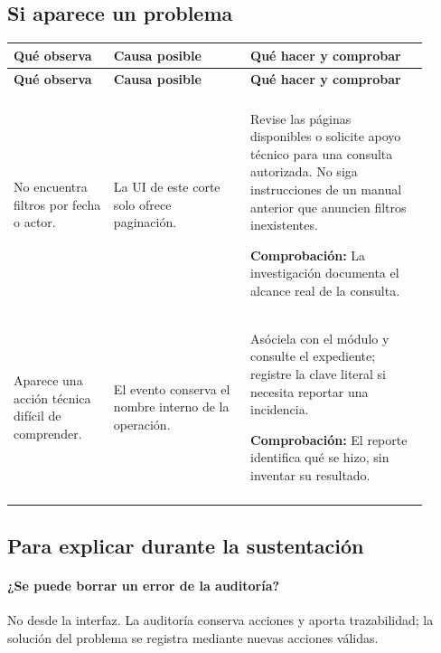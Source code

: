 \subsection{Si aparece un problema}
\begingroup
\fontsize{10}{12.5}\selectfont
\setlength{\tabcolsep}{5pt}
\renewcommand{\arraystretch}{1.15}
\begin{longtable}{@{}>{\RaggedRight\arraybackslash}p{0.22\linewidth}>{\RaggedRight\arraybackslash}p{0.3\linewidth}>{\RaggedRight\arraybackslash}p{0.39\linewidth}@{}}
\toprule
\textbf{Qué observa} & \textbf{Causa posible} & \textbf{Qué hacer y comprobar} \\
\midrule
\endfirsthead
\toprule
\textbf{Qué observa} & \textbf{Causa posible} & \textbf{Qué hacer y comprobar} \\
\midrule
\endhead
\midrule
\multicolumn{3}{r}{\footnotesize Continúa en la página siguiente}\\
\endfoot
\bottomrule
\endlastfoot
No encuentra filtros por fecha o actor. & La UI de este corte solo ofrece paginación. & Revise las páginas disponibles o solicite apoyo técnico para una consulta autorizada. No siga instrucciones de un manual anterior que anuncien filtros inexistentes.\par\smallskip\textbf{Comprobación:} La investigación documenta el alcance real de la consulta. \\
\addlinespace[3pt]
Aparece una acción técnica difícil de comprender. & El evento conserva el nombre interno de la operación. & Asóciela con el módulo y consulte el expediente; registre la clave literal si necesita reportar una incidencia.\par\smallskip\textbf{Comprobación:} El reporte identifica qué se hizo, sin inventar su resultado. \\
\addlinespace[3pt]
\end{longtable}
\endgroup

\subsection{Para explicar durante la sustentación}
\paragraph{¿Se puede borrar un error de la auditoría?} No desde la interfaz. La auditoría conserva acciones y aporta trazabilidad; la solución del problema se registra mediante nuevas acciones válidas.

\endgroup
{}

